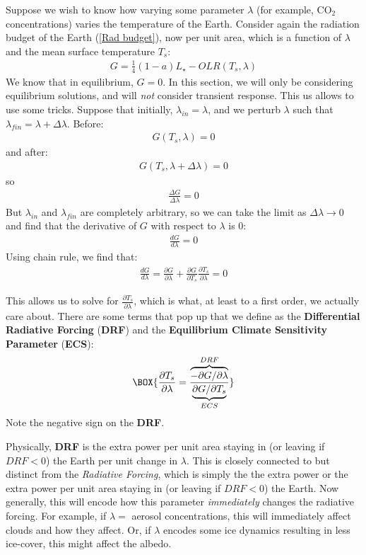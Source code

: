 Suppose we wish to know how varying some parameter $\lambda$ (for example, CO$_2$ concentrations) varies the temperature of the Earth. Consider again the radiation budget of the Earth (\ref{Rad budget}), now per unit area, which is a function of $\lambda$ and the mean surface temperature $T_s$:
\begin{align}
    G=\frac{1}{4}(1-a)L_\star-OLR(T_s,\lambda)
\end{align}
We know that in equilibrium, $G=0$. In this section, we will only be considering equilibrium solutions, and will \textit{not} consider transient response. This us allows to use some tricks. Suppose that initially, $\lambda_{in}=\lambda$, and we perturb $\lambda$ such that $\lambda_{fin}=\lambda+\Delta \lambda$. Before:
\begin{align*}
    G(T_s,\lambda)=0
\end{align*}
and after:
\begin{align*}
    G(T_s,\lambda+\Delta \lambda)=0
\end{align*}
so
\begin{align*}
    \frac{\Delta G}{\Delta \lambda}=0
\end{align*}
But $\lambda_{in}$ and $\lambda_{fin}$ are completely arbitrary, so we can take the limit as $\Delta\lambda\to 0$ and find that the derivative of $G$ with respect to $\lambda$ is 0:
\begin{align*}
    \frac{dG}{d\lambda}=0
\end{align*}
Using chain rule, we find that:
\begin{align*}
    \frac{dG}{d\lambda}=\frac{\partial G}{\partial \lambda}+\frac{\partial G}{\partial T_s}\frac{\partial T_s}{\partial \lambda}=0
\end{align*}

This allows us to solve for $\frac{\partial T_s}{\partial \lambda}$, which is what, at least to a first order, we actually care about. There are some terms that pop up that we define as the \textbf{Differential Radiative Forcing} (\textbf{DRF}) and the \textbf{Equilibrium Climate Sensitivity Parameter} (\textbf{ECS}):
\begin{align}
    \label{DRF and ECS}
    \BOX{
        \frac{\partial T_s}{\partial \lambda}=
        \frac{\overbrace{-\partial G/\partial \lambda}^{DRF}}{\underbrace{\partial G/\partial T_s}_{ECS}}
    }
\end{align}
Note the negative sign on the \textbf{DRF}.

Physically, \textbf{DRF} is the extra power per unit area staying in (or leaving if $DRF<0$) the Earth per unit change in $\lambda$. This is closely connected to but distinct from the \textit{Radiative Forcing}, which is simply the the extra power or the extra power per unit area staying in (or leaving if $DRF<0$) the Earth. Now generally, this will encode how this parameter \textit{immediately} changes the radiative forcing. For example, if $\lambda=$ aerosol concentrations, this will immediately affect clouds and how they affect. Or, if $\lambda$ encodes some ice dynamics resulting in less ice-cover, this might affect the albedo.

